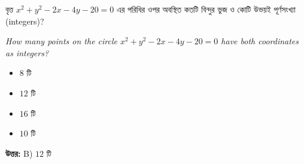 \documentclass[12pt, a4paper]{article}
\begin{document}
\begin{tcolorbox}[questionbox={প্রশ্ন (Question) 11}]
    \noindent
    বৃত্ত $x^2 + y^2 - 2x - 4y - 20 = 0$ এর পরিধির ওপর অবস্থিত কতটি বিন্দুর ভুজ ও কোটি উভয়ই পূর্ণসংখ্যা (integers)?
    
    \vspace{0.8em}
    \begin{english}
    \noindent\textit{\color{darkgray}
    How many points on the circle $x^2 + y^2 - 2x - 4y - 20 = 0$ have both coordinates as integers?
    }
    \end{english}
\end{tcolorbox}

\begin{itemize}[label={}, leftmargin=1cm, itemsep=0.5em]
    \item[\textbf{A)}] $8$ টি
    \item[\textbf{B)}] $12$ টি
    \item[\textbf{C)}] $16$ টি
    \item[\textbf{D)}] $10$ টি
\end{itemize}

\vspace{0.5em}
\begin{tcolorbox}[answerbox]
    \textbf{\color{success} উত্তর:} B) $12$ টি
\end{tcolorbox}
\vspace{1em}
\end{document}
